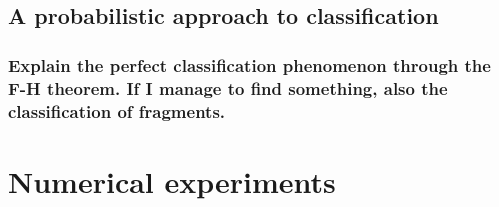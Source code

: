 \documentclass[10pt, a4paper]{report}
\theoremstyle{definition}
\theoremstyle{remark}
\begin{document}
\section{A probabilistic approach to classification}
\subsection{Explain the perfect classification phenomenon through the F-H theorem. If I manage to find something, also the classification of fragments.}

\chapter{Numerical experiments}









 

\end{document}
